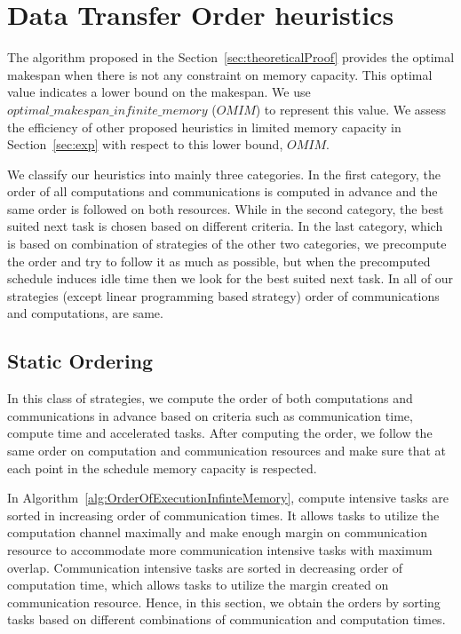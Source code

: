 \documentclass[sigconf]{acmart}
\begin{document}
	
	
	\section{Data Transfer Order heuristics}
	\label{sec:heuristics}
	
	The algorithm proposed in the Section~\ref{sec:theoreticalProof} provides the optimal makespan when there is not any constraint on memory capacity. This optimal value indicates a lower bound on the makespan. We use $optimal\_makespan\_infinite\_memory$ ($OMIM$) to represent this value. We assess the efficiency of other proposed heuristics in limited memory capacity in Section~\ref{sec:exp} with respect to this lower bound, $OMIM$.
	
	
	We classify our heuristics into mainly three categories. In the first category, the order of all computations and communications is computed in advance and the same order is followed on both resources. While in the second category, the best suited next task is chosen based on different criteria. In the last category, which is based on combination of strategies of the other two categories, we precompute the order and try to follow it as much as possible, but when the precomputed schedule induces idle time then we look for the best suited next task. In all of our strategies (except linear programming based strategy) order of communications and computations, are same.
	
	\subsection{Static Ordering}
	In this class of strategies, we compute the order of both computations and communications in advance based on criteria such as communication time, compute time and accelerated tasks. After computing the order, we follow the same order on computation and communication resources and make sure that at each point in the schedule memory capacity is respected.
	
	
	In Algorithm~\ref{alg:OrderOfExecutionInfinteMemory}, compute intensive tasks  are sorted in increasing order of communication times. It allows tasks to utilize the computation channel maximally and make enough margin on communication resource to accommodate more communication intensive tasks with maximum overlap. Communication intensive tasks are sorted in decreasing order of computation time, which allows tasks to utilize the margin created on communication resource. Hence,  in this section, we obtain the orders by sorting tasks based on different combinations of communication and computation times.
	
\end{document}
